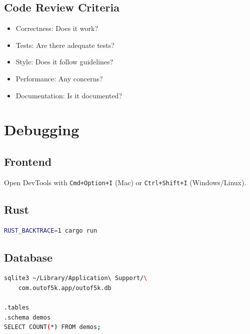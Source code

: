\subsection{Code Review Criteria}

\begin{itemize}
    \item Correctness: Does it work?
    \item Tests: Are there adequate tests?
    \item Style: Does it follow guidelines?
    \item Performance: Any concerns?
    \item Documentation: Is it documented?
\end{itemize}

\section{Debugging}

\subsection{Frontend}

Open DevTools with \texttt{Cmd+Option+I} (Mac) or \texttt{Ctrl+Shift+I} (Windows/Linux).

\subsection{Rust}

\begin{lstlisting}[language=bash]
RUST_BACKTRACE=1 cargo run
\end{lstlisting}

\subsection{Database}

\begin{lstlisting}[language=bash]
sqlite3 ~/Library/Application\ Support/\
    com.outof5k.app/outof5k.db

.tables
.schema demos
SELECT COUNT(*) FROM demos;
\end{lstlisting}
